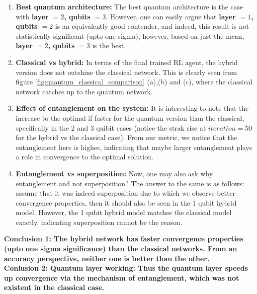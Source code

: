 \documentclass{article}
\begin{document}
\begin{enumerate}
    \item \textbf{Best quantum architecture:} The best quantum architecture is the case with \textbf{layer $= 2$, qubits $= 3$}. However, one can easily argue that \textbf{layer $= 1$, qubits $= 2$} is an equivalently good contender, and indeed, this result is not statistically significant (upto one sigma), however, based on just the mean, \textbf{layer $= 2$, qubits $= 3$} is the best.
    \item \textbf{Classical vs hybrid:} In terms of the final trained RL agent, the hybrid version does not outshine the classical network. This is clearly seen from figure \ref{fig:quantum_classical_comparison} (a),(b) and (c), where the classical network catches up to the quantum network. 
    \item \textbf{Effect of entanglement on the system:} It is interesting to note that the increase to the optimal if faster for the quantum version than the classical, specifically in the 2 and 3 quibit cases (notice the strak rise at $iteration = 50$ for the hybrid vs the classical case). From our metric, we notice that the entanglement here is higher, indicating that maybe larger entanglement plays a role in convergence to the optimal solution. 
    \item \textbf{Entanglement vs superposition:} Now, one may also ask why entanglement and not superposition? The answer to the same is as follows: assume that it was indeed superposition due to which we observe better convergence properties, then it should also be seen in the 1 qubit hybrid model. However, the 1 qubit hybrid model matches the classical model exactly, indicating superposition cannot be the reason. 
\end{enumerate}
\textbf{Conclusion 1: The hybrid network has faster convergence properties (upto one sigma significance) than the classical networks. From an accuracy perspective, neither one is better than the other.   
} \\
\textbf{Conlusion 2: Quantum layer working: Thus the quantum layer speeds up convergence via the mechanism of entanglement, which was not existent in the classical case. }

\end{document}
